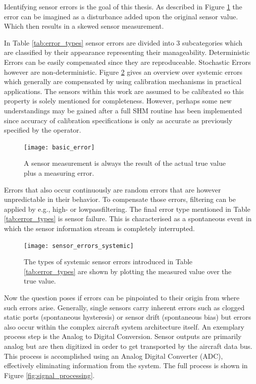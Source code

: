 Identifying sensor errors is the goal of this thesis. As described in Figure \ref{fig:basic_error} the error can be imagined as a disturbance added upon the original sensor value. Which then results in a skewed sensor measurement.

In Table \ref{tab:error_types} sensor errors are divided into 3 subcategories which are classified by their appearance representing their manageability. Deterministic Errors can be easily compensated since they are reproduceable. Stochastic Errors however are non-deterministic. Figure \ref{fig:sensor_errors_systemic} gives an overview over systemic errors which generally are compensated by using calibration mechanisms in practical applications. The sensors within this work are assumed to be calibrated so this property is solely mentioned for completeness. However, perhaps some new understandings may be gained after a full SHM routine has been implemented since accuracy of calibration specifications is only as accurate as previously specified by the operator.

\begin{figure}[h]
    \centering
    \texttt{[image: basic\_error]}
    \caption{A sensor measurement is always the result of the actual true value plus a measuring error.}
    \label{fig:basic_error}
\end{figure}

Errors that also occur continuously are random errors that are however unpredictable in their behavior. To compensate those errors, filtering can be applied by e.g., high- or lowpassfiltering. The final error type mentioned in Table \ref{tab:error_types} is sensor failure. This is characterised as a spontaneous event in which the sensor information stream is completely interrupted.

\begin{figure}[h]
    \centering
    \texttt{[image: sensor\_errors\_systemic]}
    \caption[Systemic Sensor Errors]{The types of systemic sensor errors introduced in Table \ref{tab:error_types} are shown by plotting the measured value over the true value. \cite{hartmann_flugfuhrung_2022, din_fundamentals_1995} }
    \label{fig:sensor_errors_systemic}
\end{figure}
Now the question poses if errors can be pinpointed to their origin from where such errors arise. Generally, single sensors carry inherent errors such as clogged static ports (spontaneous hysteresis) or sensor drift (spontaneous bias) but errors also occur within the complex aircraft system architecture itself. An exemplary process step is the Analog to Digital Conversion. Sensor outputs are primarily analog but are then digitized in order to get transported by the aircraft data bus. This process is accomplished using an Analog Digital Converter (ADC), effectively eliminating information from the system. The full process is shown in Figure \ref{fig:signal_processing}.

